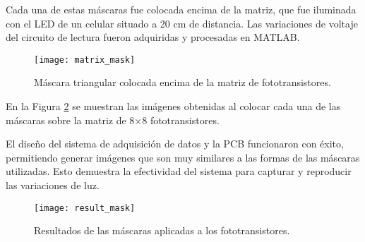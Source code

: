 Cada una de estas máscaras fue colocada encima de la matriz, que fue iluminada con el LED de un celular situado a 20 cm de distancia. Las variaciones de voltaje del circuito de lectura fueron adquiridas y procesadas en MATLAB.

            \begin{figure}[hbtp]
                \centering
                \texttt{[image: matrix\_mask]}
                \caption{Máscara triangular colocada encima de la matriz de fototransistores.}
                \label{fig:matrix_mask}
            \end{figure} 
\newpage
En la Figura \ref{fig:result_mask} se muestran las imágenes obtenidas al colocar cada una de las máscaras sobre la matriz de 8$\times$8 fototransistores. 


El diseño del sistema de adquisición de datos y la PCB funcionaron con éxito, permitiendo generar imágenes que son muy similares a las formas de las máscaras utilizadas. Esto demuestra la efectividad del sistema para capturar y reproducir las variaciones de luz.


            \begin{figure}[hbtp]
                \centering
                \texttt{[image: result\_mask]}
                \caption{Resultados de las máscaras aplicadas a los fototransistores.}
                \label{fig:result_mask}
            \end{figure}
